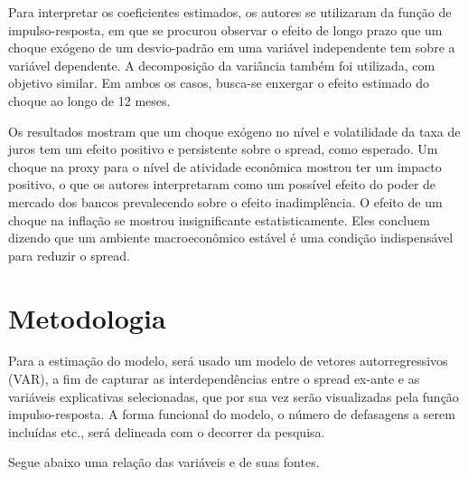 \documentclass[a4paper, article, 12pt, openany, oneside, english, brazil]{abntex2}
\begin{document}
    Para interpretar os coeficientes estimados, os autores se utilizaram da função de impulso-resposta, em que se procurou observar o efeito de longo prazo que um choque exógeno de um desvio-padrão em uma variável independente tem sobre a variável dependente. A decomposição da variância também foi utilizada, com objetivo similar. Em ambos os casos, busca-se enxergar o efeito estimado do choque ao longo de 12 meses.

    Os resultados mostram que um choque exógeno no nível e volatilidade da taxa de juros tem um efeito positivo e persistente sobre o spread, como esperado. Um choque na proxy para o nível de atividade econômica mostrou ter um impacto positivo, o que os autores interpretaram como um possível efeito do poder de mercado dos bancos prevalecendo sobre o efeito inadimplência. O efeito de um choque na inflação se mostrou insignificante estatisticamente. Eles concluem dizendo que um ambiente macroeconômico estável é uma condição indispensável para reduzir o spread.

\section{Metodologia}

    Para a estimação do modelo, será usado um modelo de vetores autorregressivos (VAR), a fim de capturar as interdependências entre o spread ex-ante e as variáveis explicativas selecionadas, que por sua vez serão visualizadas pela função impulso-resposta. A forma funcional do modelo, o número de defasagens a serem incluídas etc., será delineada com o decorrer da pesquisa.

    Segue abaixo uma relação das variáveis e de suas fontes.

    \begin{table}[h]
    \centering
    \end{table}
\end{document}
